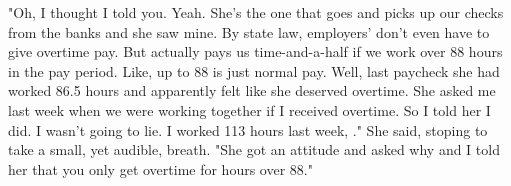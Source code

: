 "Oh, I thought I told you.
Yeah. She's the one that goes and picks up our checks from the banks
and she saw mine.  By state law, employers' don't even have to
give overtime pay.  But \mike{} actually pays us time-and-a-half if
we work over 88 hours in the pay period.
Like, up to 88 is just normal pay.
Well, last paycheck she had worked 86.5 hours and apparently felt like
she deserved overtime.  She asked me last week when we were working together
if I received overtime.  So I told her I did.  I wasn't going to lie.
I worked 113 hours last week, \josh."
She said, stoping to take a small, yet audible, breath.
"She got an attitude and asked why and I told her that you only get overtime
for hours over 88."
%
%
%
%
%
%
%
